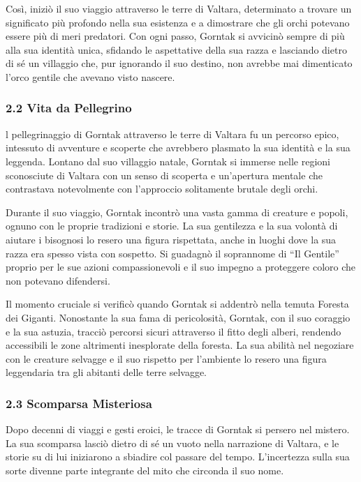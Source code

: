 Così, iniziò il suo viaggio attraverso le terre di Valtara, determinato
a trovare un significato più profondo nella sua esistenza e a dimostrare
che gli orchi potevano essere più di meri predatori. Con ogni passo,
Gorntak si avvicinò sempre di più alla sua identità unica, sfidando le
aspettative della sua razza e lasciando dietro di sé un villaggio che,
pur ignorando il suo destino, non avrebbe mai dimenticato l'orco gentile
che avevano visto nascere.

\subsubsection{2.2 Vita da Pellegrino}\label{vita-da-pellegrino}

l pellegrinaggio di Gorntak attraverso le terre di Valtara fu un
percorso epico, intessuto di avventure e scoperte che avrebbero plasmato
la sua identità e la sua leggenda. Lontano dal suo villaggio natale,
Gorntak si immerse nelle regioni sconosciute di Valtara con un senso di
scoperta e un'apertura mentale che contrastava notevolmente con
l'approccio solitamente brutale degli orchi.

Durante il suo viaggio, Gorntak incontrò una vasta gamma di creature e
popoli, ognuno con le proprie tradizioni e storie. La sua gentilezza e
la sua volontà di aiutare i bisognosi lo resero una figura rispettata,
anche in luoghi dove la sua razza era spesso vista con sospetto. Si
guadagnò il soprannome di ``Il Gentile'' proprio per le sue azioni
compassionevoli e il suo impegno a proteggere coloro che non potevano
difendersi.

Il momento cruciale si verificò quando Gorntak si addentrò nella temuta
Foresta dei Giganti. Nonostante la sua fama di pericolosità, Gorntak,
con il suo coraggio e la sua astuzia, tracciò percorsi sicuri attraverso
il fitto degli alberi, rendendo accessibili le zone altrimenti
inesplorate della foresta. La sua abilità nel negoziare con le creature
selvagge e il suo rispetto per l'ambiente lo resero una figura
leggendaria tra gli abitanti delle terre selvagge.

\subsubsection{\texorpdfstring{2.3 \textbf{Scomparsa
Misteriosa}}{2.3 Scomparsa Misteriosa}}\label{scomparsa-misteriosa}

Dopo decenni di viaggi e gesti eroici, le tracce di Gorntak si persero
nel mistero. La sua scomparsa lasciò dietro di sé un vuoto nella
narrazione di Valtara, e le storie su di lui iniziarono a sbiadire col
passare del tempo. L'incertezza sulla sua sorte divenne parte integrante
del mito che circonda il suo nome.

